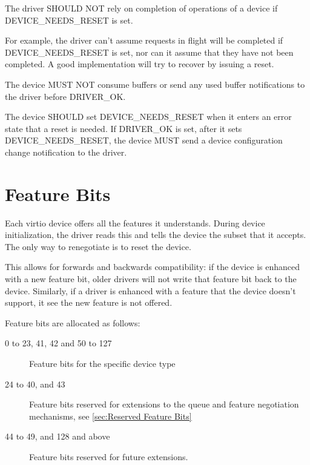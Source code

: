 The driver SHOULD NOT rely on completion of operations of a
device if DEVICE_NEEDS_RESET is set.
\begin{note}
For example, the driver can't assume requests in flight will be
completed if DEVICE_NEEDS_RESET is set, nor can it assume that
they have not been completed.  A good implementation will try to
recover by issuing a reset.
\end{note}


The device MUST NOT consume buffers or send any used buffer
notifications to the driver before DRIVER_OK.

\label{sec:Basic Facilities of a Virtio Device / Device Status Field / DEVICENEEDSRESET}The device SHOULD set DEVICE_NEEDS_RESET when it enters an error state
that a reset is needed.  If DRIVER_OK is set, after it sets DEVICE_NEEDS_RESET, the device
MUST send a device configuration change notification to the driver.

\section{Feature Bits}\label{sec:Basic Facilities of a Virtio Device / Feature Bits}

Each virtio device offers all the features it understands.  During
device initialization, the driver reads this and tells the device the
subset that it accepts.  The only way to renegotiate is to reset
the device.

This allows for forwards and backwards compatibility: if the device is
enhanced with a new feature bit, older drivers will not write that
feature bit back to the device.  Similarly, if a driver is enhanced with a feature
that the device doesn't support, it see the new feature is not offered.

Feature bits are allocated as follows:

\begin{description}
\item[0 to 23, 41, 42 and 50 to 127] Feature bits for the specific device type

\item[24 to 40, and 43] Feature bits reserved for extensions to the queue and
  feature negotiation mechanisms, see \ref{sec:Reserved Feature Bits}

\item[44 to 49, and 128 and above] Feature bits reserved for future extensions.
\end{description}

